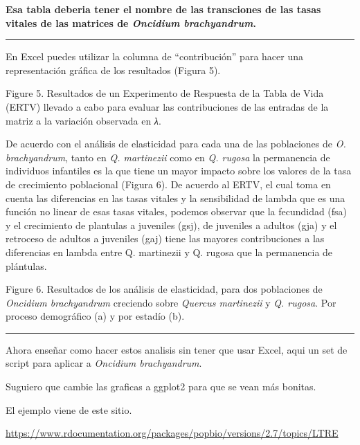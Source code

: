 \documentclass[
]{book}
\theoremstyle{definition}
\theoremstyle{definition}
\theoremstyle{definition}
\theoremstyle{definition}
\theoremstyle{remark}
\begin{document}
\textbf{Esa tabla deberia tener el nombre de las transciones de las tasas vitales de las matrices de \emph{Oncidium brachyandrum}. }

\begin{center}\rule{0.5\linewidth}{0.5pt}\end{center}

En Excel puedes utilizar la columna de ``contribución'' para hacer una representación gráfica de los resultados (Figura 5).

Figure 5. Resultados de un Experimento de Respuesta de la Tabla de Vida (ERTV) llevado a cabo para evaluar las contribuciones de las entradas de la matriz a la variación observada en \emph{λ}.

De acuerdo con el análisis de elasticidad para cada una de las poblaciones de \emph{O. brachyandrum}, tanto en \emph{Q. martinezii} como en \emph{Q. rugosa} la permanencia de individuos infantiles es la que tiene un mayor impacto sobre los valores de la tasa de crecimiento poblacional (Figura 6). De acuerdo al ERTV, el cual toma en cuenta las diferencias en las tasas vitales y la sensibilidad de lambda que es una función no linear de esas tasas vitales, podemos observar que la fecundidad (fsa) y el crecimiento de plantulas a juveniles (gsj), de juveniles a adultos (gja) y el retroceso de adultos a juveniles (gaj) tiene las mayores contribuciones a las diferencias en lambda entre Q. martinezii y Q. rugosa que la permanencia de plántulas.

Figure 6. Resultados de los análisis de elasticidad, para dos poblaciones de \emph{Oncidium brachyandrum} creciendo sobre \emph{Quercus martinezii} y \emph{Q. rugosa}. Por proceso demográfico (a) y por estadío (b).

\begin{center}\rule{0.5\linewidth}{0.5pt}\end{center}

Ahora enseñar como hacer estos analisis sin tener que usar Excel, aqui un set de script para aplicar a \emph{Oncidium brachyandrum}.

Suguiero que cambie las graficas a ggplot2 para que se vean más bonitas.

El ejemplo viene de este sitio.

\url{https://www.rdocumentation.org/packages/popbio/versions/2.7/topics/LTRE}
\end{document}

